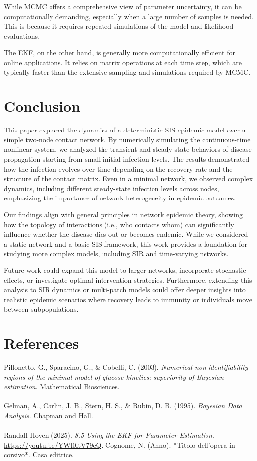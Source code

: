 \documentclass[a4paper,10pt]{report}
\begin{document}
While MCMC offers a comprehensive view of parameter uncertainty, it can be computationally demanding, especially when a large number of samples is needed. This is because it requires repeated simulations of the model and likelihood evaluations.

The EKF, on the other hand, is generally more computationally efficient for online applications. It relies on matrix operations at each time step, which are typically faster than the extensive sampling and simulations required by MCMC.
\section{Conclusion}

This paper explored the dynamics of a deterministic SIS epidemic model over a simple two-node contact network. By numerically simulating the continuous-time nonlinear system, we analyzed the transient and steady-state behaviors of disease propagation starting from small initial infection levels. The results demonstrated how the infection evolves over time depending on the recovery rate and the structure of the contact matrix. Even in a minimal network, we observed complex dynamics, including different steady-state infection levels across nodes, emphasizing the importance of network heterogeneity in epidemic outcomes.

Our findings align with general principles in network epidemic theory, showing how the topology of interactions (i.e., who contacts whom) can significantly influence whether the disease dies out or becomes endemic. While we considered a static network and a basic SIS framework, this work provides a foundation for studying more complex models, including SIR and time-varying networks.

Future work could expand this model to larger networks, incorporate stochastic effects, or investigate optimal intervention strategies. Furthermore, extending this analysis to SIR dynamics or multi-patch models could offer deeper insights into realistic epidemic scenarios where recovery leads to immunity or individuals move between subpopulations.


\section*{References}


Pillonetto, G., Sparacino, G., \& Cobelli, C. (2003).
\textit{Numerical non-identifiability regions of the minimal model of glucose kinetics: superiority of Bayesian estimation}.
Mathematical Biosciences.\\ \\
Gelman, A., Carlin, J. B., Stern, H. S., \& Rubin, D. B. (1995).
\textit{Bayesian Data Analysis}.
Chapman and Hall.\\ \\
Randall Hoven  (2025). \textit{8.5 Using the EKF for Parameter Estimation}. \url{https://youtu.be/YWl0ltV79eQ}.
Cognome, N. (Anno). *Titolo dell'opera in corsivo*. Casa editrice.
\end{document}
